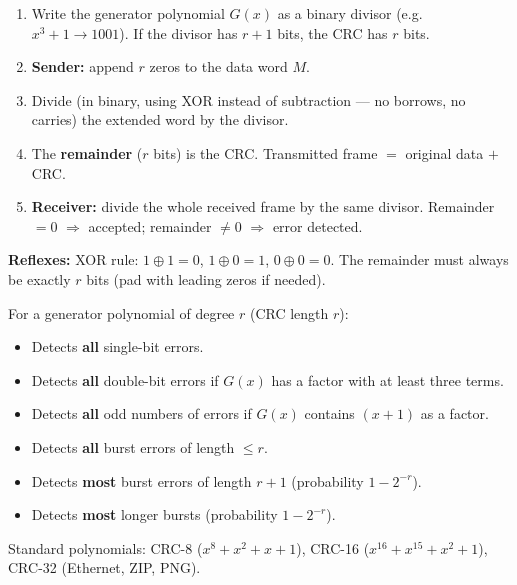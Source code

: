 \documentclass[11pt]{article}
\newcommand{\cle}[1]{{\popxbold\color{popdark}#1}}
\begin{document}
\begin{methode}
\begin{enumerate}
\item Write the generator polynomial $G(x)$ as a binary divisor (e.g. $x^3+1 \rightarrow 1001$). If the divisor has $r+1$ bits, the CRC has $r$ bits.
\item \textbf{Sender:} append $r$ zeros to the data word $M$.
\item Divide (in binary, using \cle{XOR} instead of subtraction — no borrows, no carries) the extended word by the divisor.
\item The \textbf{remainder} ($r$ bits) is the CRC. Transmitted frame $=$ original data $+$ CRC.
\item \textbf{Receiver:} divide the whole received frame by the same divisor. Remainder $= 0$ $\Rightarrow$ accepted; remainder $\neq 0$ $\Rightarrow$ error detected.
\end{enumerate}
\textbf{Reflexes:} XOR rule: $1\oplus1=0$, $1\oplus0=1$, $0\oplus0=0$. The remainder must always be exactly $r$ bits (pad with leading zeros if needed).
\end{methode}

\begin{aretenir}
For a generator polynomial of degree $r$ (CRC length $r$):
\begin{itemize}
\item Detects \textbf{all} single-bit errors.
\item Detects \textbf{all} double-bit errors if $G(x)$ has a factor with at least three terms.
\item Detects \textbf{all} odd numbers of errors if $G(x)$ contains $(x+1)$ as a factor.
\item Detects \textbf{all} burst errors of length $\le r$.
\item Detects \textbf{most} burst errors of length $r+1$ (probability $1-2^{-r}$).
\item Detects \textbf{most} longer bursts (probability $1-2^{-r}$).
\end{itemize}
Standard polynomials: CRC-8 ($x^8+x^2+x+1$), CRC-16 ($x^{16}+x^{15}+x^2+1$), CRC-32 (Ethernet, ZIP, PNG).
\end{aretenir}
\end{document}
